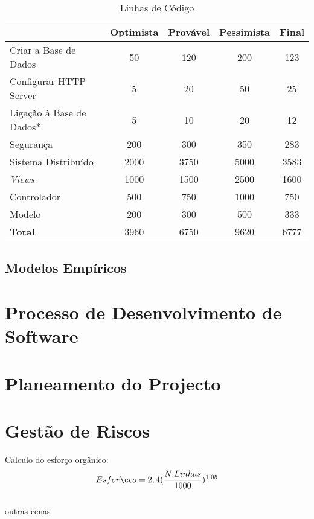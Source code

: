 \documentclass[12pt, a4paper, twoside]{report} %
\begin{document}
\begin{table}[h]
\centering
\begin{tabular}{|l|c c c c|}
\hline
                       		& Optimista & Provável & Pessimista & Final \\ \hline
Criar a Base de Dados  		& 50        & 120      & 200        & 123   \\ \hline
Configurar HTTP Server 		& 5         & 20       & 50         & 25    \\ \hline
Ligação à Base de Dados*	& 5         & 10       & 20         & 12    \\ \hline
Segurança              		& 200       & 300      & 350        & 283   \\ \hline
Sistema Distribuído         & 2000      & 3750     & 5000       & 3583   \\ \hline
\textit{Views}            	& 1000      & 1500     & 2500       & 1600  \\ \hline
Controlador                 & 500       & 750      & 1000       & 750   \\ \hline
Modelo                      & 200       & 300      & 500        & 333   \\ \hline
\textbf{Total}		   		& 3960      & 6750     & 9620       & 6777  \\ \hline
\end{tabular}
\caption{Linhas de Código}
\label{codigo}
\end{table}

\subsection{Modelos Empíricos}

\section{Processo de Desenvolvimento de Software}

\section{Planeamento do Projecto}

\section{Gestão de Riscos}

Calculo do esforço orgânico:
\\
\begin{equation} Esforço = 2,4 ({N.Linhas \over 1000})^{1.05}
\end{equation}
\\
outras cenas
\end{document}
